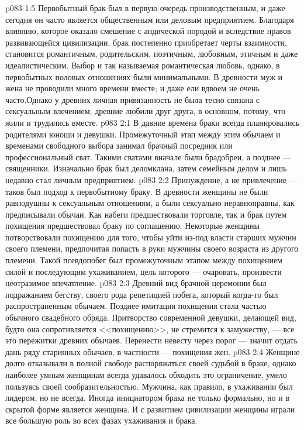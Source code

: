 \vs p083 1:5 Первобытный брак был в первую очередь производственным, и даже сегодня он часто является общественным или деловым предприятием. Благодаря влиянию, которое оказало смешение с андической породой и вследствие нравов развивающейся цивилизации, брак постепенно приобретает черты взаимности, становится романтичным, родительским, поэтичным, любовным, этичным и даже идеалистическим. Выбор и так называемая романтическая любовь, однако, в первобытных половых отношениях были минимальными. В древности муж и жена не проводили много времени вместе; и даже ели вдвоем не очень часто.Однако у древних личная привязанность не была тесно связана с сексуальным влечением; древние любили друг друга, в основном, потому, что жили и трудились вместе.
\vs p083 2:1 В давние времена браки всегда планировались родителями юноши и девушки. Промежуточный этап между этим обычаем и временами свободного выбора занимал брачный посредник или профессиональный сват. Такими сватами вначале были брадобреи, а позднее --- священники. Изначально брак был деломклана, затем семейным делом и лишь недавно стал личным предприятием.
\vs p083 2:2 Принуждение, а не привлечение --- таков был подход к первобытному браку. В древности женщины не были равнодушны к сексуальным отношениям, а были сексуально неравноправны, как предписывали обычаи. Как набеги предшествовали торговле, так и брак путем похищения предшествовал браку по соглашению. Некоторые женщины потворствовали похищению для того, чтобы уйти из\hyp{}под власти старших мужчин своего племени, предпочитая попасть в руки мужчины своего возраста из другого племени. Такой псевдопобег был промежуточным этапом между похищением силой и последующим ухаживанием, цель которого --- очаровать, произвести неотразимое впечатление.
\vs p083 2:3 Древний вид брачной церемонии был подражанием бегству, своего рода репетицией побега, который когда\hyp{}то был распространенным обычаем. Позднее имитация похищения стала частью обычного свадебного обряда. Притворство современной девушки, делающей вид, будто она сопротивляется <<похищению>>, не стремится к замужеству, --- все это пережитки древних обычаев. Перенести невесту через порог --- значит отдать дань ряду старинных обычаев, в частности --- похищения жен.
\vs p083 2:4 Женщине долго отказывали в полной свободе распоряжаться своей судьбой в браке, однако наиболее умным женщинам всегда удавалось обходить это ограничение, умело пользуясь своей сообразительностью. Мужчина, как правило, в ухаживании был лидером, но не всегда. Иногда инициатором брака не только формально, но и в скрытой форме является женщина. И с развитием цивилизации женщины играли все большую роль во всех фазах ухаживания и брака.
